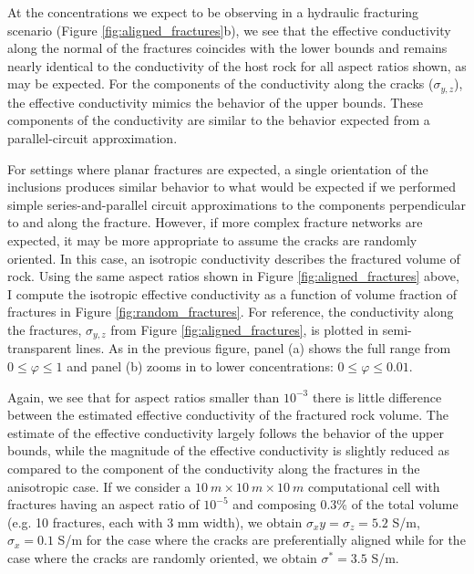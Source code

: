 At the concentrations we expect to be observing in a hydraulic fracturing scenario (Figure \ref{fig:aligned_fractures}b), we see that the effective conductivity along the normal of the fractures coincides with the lower bounds and remains nearly identical to the conductivity of the host rock for all aspect ratios shown, as may be expected. For the components of the conductivity along the cracks ($\sigma_{y, z}$), the effective conductivity mimics the behavior of the upper bounds. These components of the conductivity are similar to the behavior expected from a parallel-circuit approximation.

For settings where planar fractures are expected, a single orientation of the inclusions produces similar behavior to what would be expected if we performed simple series-and-parallel circuit approximations to the components perpendicular to and along the fracture. However, if more complex fracture networks are expected, it may be more appropriate to assume the cracks are randomly oriented. In this case, an isotropic conductivity describes the fractured volume of rock. Using the same aspect ratios shown in Figure \ref{fig:aligned_fractures} above, I compute the isotropic effective conductivity as a function of volume fraction of fractures in Figure \ref{fig:random_fractures}. For reference, the conductivity along the fractures, $\sigma_{y, z}$ from Figure \ref{fig:aligned_fractures}, is plotted in semi-transparent lines. As in the previous figure, panel (a) shows the full range from $0 \leq \varphi \leq 1$ and panel (b) zooms in to lower concentrations: $0 \leq \varphi \leq 0.01$.



Again, we see that for aspect ratios smaller than $10^{-3}$ there is little difference between the estimated effective conductivity of the fractured rock volume. The estimate of the effective conductivity largely follows the behavior of the upper bounds, while the magnitude of the effective conductivity is slightly reduced as compared to the component of the conductivity along the fractures in the anisotropic case. If we consider a $10~m \times 10~m \times 10~m$ computational cell with fractures having an aspect ratio of $10^{-5}$ and composing 0.3\% of the total volume (e.g. 10 fractures, each with 3 mm width), we obtain $\sigma_xy= \sigma_z = 5.2$ S/m, $\sigma_x = 0.1$ S/m for the case where the cracks are preferentially aligned while for the case where the cracks are randomly oriented, we obtain $\sigma^* = 3.5$ S/m.

